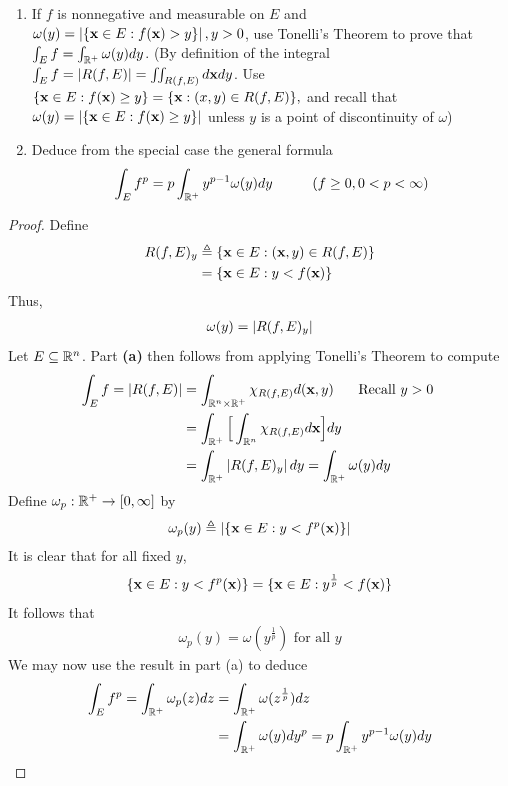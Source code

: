 \documentclass{report}
\begin{document}
\begin{question}{}{}
\begin{enumerate}[label=(\alph*)]
  \item If $f$ is nonnegative and measurable on $E$ and  $\omega (y)= \left|\{ \textbf{x}\in E: f(\textbf{x})>y \}\right|,y>0$, use Tonelli's Theorem to prove that  $\int_E f=\int_{\mathbb{R}^+}\omega (y)dy$. (By definition of the integral $\int_E f=\left|R(f,E)\right|=\iint_{R(f,E)} d\textbf{x}dy$. Use $\{ \textbf{x}\in E:f(\textbf{x})\geq y \}=\{ \textbf{x}:(x,y)\in R(f,E) \},$ and recall that $\omega (y)= \left|\{ \textbf{x}\in E:f(\textbf{x})\geq y \}\right|$ unless $y$ is a point of discontinuity of  $\omega$)
  \item Deduce from the special case the general formula 
    \begin{align*}
    \int_E f^p = p \int_{\mathbb{R}^+} y^{p-1}\omega (y)dy\hspace{1cm}(f\geq 0,0<p<\infty)
    \end{align*}
\end{enumerate}
\end{question}
\begin{proof}
Define 
\begin{align*}
  R(f,E)_y&\triangleq \{ \textbf{x} \in E:(\textbf{x},y)\in R(f,E) \} \\
  &= \{ \textbf{x}\in E: y< f(\textbf{x}) \}
\end{align*}
Thus, 
\begin{align*}
\omega (y)= \left|R(f,E)_y\right|
\end{align*}
Let $E\subseteq \mathbb{R}^n$. Part \textbf{(a)} then follows from applying Tonelli's Theorem to compute  
\begin{align*}
\int_E f=\left|R(f,E)\right|&=\int_{\mathbb{R}^n \times \mathbb{R}^+} \chi_{R(f,E)}  d(\textbf{x},y)\hspace{0.5cm}\text{ Recall $y>0$ }\\
&=\int_{\mathbb{R}^+} \Big[\int_{\mathbb{R}^n} \chi_{R(f,E)} d\textbf{x}  \Big] dy \\
&=\int_{\mathbb{R}^+} \left|R(f,E)_y\right| dy=\int_{\mathbb{R}^+}\omega (y)dy
\end{align*}
Define $\omega_p:\mathbb{R}^+\rightarrow [0,\infty]$ by 
\begin{align*}
  \omega_p (y)\triangleq \left|\{ \textbf{x}\in E: y<f^p(\textbf{x}) \}\right|
\end{align*}
It is clear that for all fixed $y$, 
 \begin{align*}
\{ \textbf{x}\in E:y <f^p(\textbf{x}) \}= \{ \textbf{x}\in E: y^{\frac{1}{p}}<f(\textbf{x}) \}
\end{align*}
It follows that 
\begin{align*}
\omega_p(y)= \omega (y^{\frac{1}{p}})\text{ for all }y
\end{align*}
We may now use the result in part (a) to deduce 
\begin{align*}
\int_E f^p= \int_{\mathbb{R}^+}\omega_p(z)dz&=\int_{\mathbb{R}^+}\omega (z ^{\frac{1}{p}})dz  \\
&=\int_{\mathbb{R}^+}\omega (y)dy^{p}=  p \int_{\mathbb{R}^+}y^{p-1}\omega (y)dy
\end{align*}
\end{proof}
\end{document}
